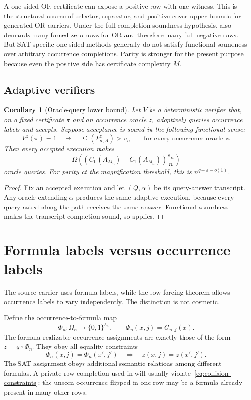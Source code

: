 \documentclass[11pt]{article}
\newtheorem{corollary}[theorem]{Corollary}
\theoremstyle{definition}
\newcommand{\bits}{\{0,1\}}
\newcommand{\Ckt}{\operatorname{C}}
\newcommand{\eps}{\varepsilon}
\begin{document}
A one-sided OR certificate can expose a positive row with one witness. This is the structural source of selector, separator, and positive-cover upper bounds for generated OR carriers. Under the full completion-soundness hypothesis,  also demands many forced zero rows for OR and therefore many full negative rows. But SAT-specific one-sided methods generally do not satisfy functional soundness over arbitrary occurrence completions. Parity is stronger for the present purpose because even the positive side has certificate complexity $M$.

\subsection{Adaptive verifiers}

\begin{corollary}[Oracle-query lower bound]\label{cor:oracle-verifier}
Let $V$ be a deterministic verifier that, on a fixed certificate $\pi$ and an occurrence oracle $z$, adaptively queries occurrence labels and accepts. Suppose acceptance is sound in the following functional sense:
\[
  V^z(\pi)=1
  \quad\Longrightarrow\quad
  \Ckt(F_{n,A}^z)>s_n
  \qquad\text{for every occurrence oracle }z.
\]
Then every accepted execution makes
\[
  \Omega\!\left((C_0(A_{M_n})+C_1(A_{M_n}))\frac{s_n}{n}\right)
\]
oracle queries. For parity at the magnification threshold, this is $n^{q+\eps-o(1)}$.
\end{corollary}

\begin{proof}
Fix an accepted execution and let $(Q,\alpha)$ be its query-answer transcript. Any oracle extending $\alpha$ produces the same adaptive execution, because every query asked along the path receives the same answer. Functional soundness makes the transcript completion-sound, so  applies.
\end{proof}

\section{Formula labels versus occurrence labels}\label{sec:formula-v-occurrence}

The source carrier uses formula labels, while the row-forcing theorem allows occurrence labels to vary independently. The distinction is not cosmetic.

Define the occurrence-to-formula map
\[
  \Phi_n:\Omega_n\to\bits^{\ell_n},
  \qquad
  \Phi_n(x,j)=G_{n,j}(x).
\]
The formula-realizable occurrence assignments are exactly those of the form $z=y\circ\Phi_n$. They obey all equality constraints
\begin{equation}\label{eq:collision-constraints}
  \Phi_n(x,j)=\Phi_n(x',j')
  \quad\Longrightarrow\quad
  z(x,j)=z(x',j').
\end{equation}
The SAT assignment obeys additional semantic relations among different formulas. A private-row completion used in  will usually violate~\eqref{eq:collision-constraints}: the unseen occurrence flipped in one row may be a formula already present in many other rows.
\end{document}
